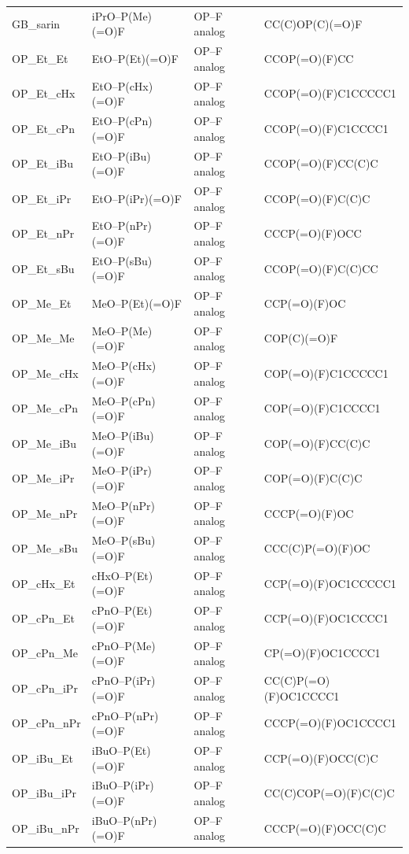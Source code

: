 \documentclass[11pt]{article}
\begin{document}
{\begin{longtable}{p{2.9cm} >{\raggedright\arraybackslash}p{2.8cm} >{\raggedright\arraybackslash}p{3.7cm} >{\ttfamily\raggedright\arraybackslash}p{4.4cm}}
GB\_sarin & iPrO--P(Me)(=O)F & OP--F analog & {CC(C)OP(C)(=O)F} \\
OP\_Et\_Et & EtO--P(Et)(=O)F & OP--F analog & {CCOP(=O)(F)CC} \\
OP\_Et\_cHx & EtO--P(cHx)(=O)F & OP--F analog & {CCOP(=O)(F)C1CCCCC1} \\
OP\_Et\_cPn & EtO--P(cPn)(=O)F & OP--F analog & {CCOP(=O)(F)C1CCCC1} \\
OP\_Et\_iBu & EtO--P(iBu)(=O)F & OP--F analog & {CCOP(=O)(F)CC(C)C} \\
OP\_Et\_iPr & EtO--P(iPr)(=O)F & OP--F analog & {CCOP(=O)(F)C(C)C} \\
OP\_Et\_nPr & EtO--P(nPr)(=O)F & OP--F analog & {CCCP(=O)(F)OCC} \\
OP\_Et\_sBu & EtO--P(sBu)(=O)F & OP--F analog & {CCOP(=O)(F)C(C)CC} \\
OP\_Me\_Et & MeO--P(Et)(=O)F & OP--F analog & {CCP(=O)(F)OC} \\
OP\_Me\_Me & MeO--P(Me)(=O)F & OP--F analog & {COP(C)(=O)F} \\
OP\_Me\_cHx & MeO--P(cHx)(=O)F & OP--F analog & {COP(=O)(F)C1CCCCC1} \\
OP\_Me\_cPn & MeO--P(cPn)(=O)F & OP--F analog & {COP(=O)(F)C1CCCC1} \\
OP\_Me\_iBu & MeO--P(iBu)(=O)F & OP--F analog & {COP(=O)(F)CC(C)C} \\
OP\_Me\_iPr & MeO--P(iPr)(=O)F & OP--F analog & {COP(=O)(F)C(C)C} \\
OP\_Me\_nPr & MeO--P(nPr)(=O)F & OP--F analog & {CCCP(=O)(F)OC} \\
OP\_Me\_sBu & MeO--P(sBu)(=O)F & OP--F analog & {CCC(C)P(=O)(F)OC} \\
OP\_cHx\_Et & cHxO--P(Et)(=O)F & OP--F analog & {CCP(=O)(F)OC1CCCCC1} \\
OP\_cPn\_Et & cPnO--P(Et)(=O)F & OP--F analog & {CCP(=O)(F)OC1CCCC1} \\
OP\_cPn\_Me & cPnO--P(Me)(=O)F & OP--F analog & {CP(=O)(F)OC1CCCC1} \\
OP\_cPn\_iPr & cPnO--P(iPr)(=O)F & OP--F analog & {CC(C)P(=O)(F)OC1CCCC1} \\
OP\_cPn\_nPr & cPnO--P(nPr)(=O)F & OP--F analog & {CCCP(=O)(F)OC1CCCC1} \\
OP\_iBu\_Et & iBuO--P(Et)(=O)F & OP--F analog & {CCP(=O)(F)OCC(C)C} \\
OP\_iBu\_iPr & iBuO--P(iPr)(=O)F & OP--F analog & {CC(C)COP(=O)(F)C(C)C} \\
OP\_iBu\_nPr & iBuO--P(nPr)(=O)F & OP--F analog & {CCCP(=O)(F)OCC(C)C} \\

\end{longtable}}
\end{document}
